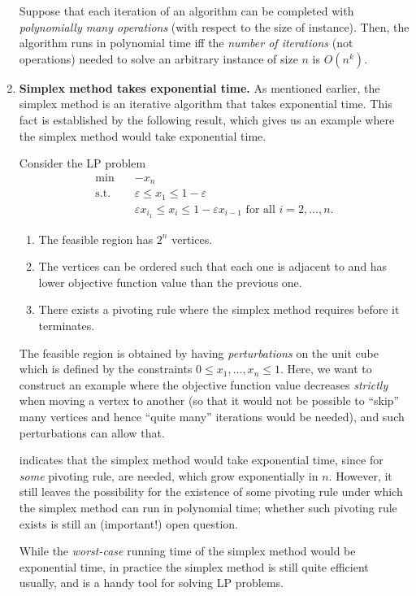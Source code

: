 \begin{enumerate}
Suppose that each iteration of an algorithm can be completed with
\emph{polynomially many operations} (with respect to the size of instance).
Then, the algorithm runs in polynomial time iff the \emph{number of iterations}
(not operations) needed to solve an arbitrary instance of size \(n\) is
\(O(n^k)\).
\item \textbf{Simplex method takes exponential time.} As mentioned earlier, the
simplex method is an iterative algorithm that takes exponential time. This fact
is established by the following result, which gives us an example where the
simplex method would take exponential time.

\begin{proposition}
\label{prp:simplex-expo-time}
Consider the LP problem
\begin{align*}
\text{min}\quad&-x_n \\
\text{s.t.}\quad&\varepsilon\le x_1\le 1-\varepsilon \\
&\varepsilon x_{i_1}\le x_i\le 1-\varepsilon x_{i-1}\text{ for all \(i=2,\dotsc,n\).}
\end{align*}
\begin{enumerate}
\item The feasible region has \(2^n\) vertices.
\item The vertices can be ordered such that each one is adjacent to and has
lower objective function value than the previous one.
\item There exists a pivoting rule where the simplex method requires
 before it terminates.
\end{enumerate}
\end{proposition}
\begin{intuition}
The feasible region is obtained by having \emph{perturbations} on the unit cube
which is defined by the constraints \(0\le x_1,\dotsc,x_n\le 1\). Here, we want
to construct an example where the objective function value decreases
\emph{strictly} when moving a vertex to another (so that it would not be
possible to ``skip'' many vertices and hence ``quite many'' iterations would be
needed), and such perturbations can allow that.
\end{intuition}

 indicates that the simplex method would take
exponential time, since for \emph{some} pivoting rule, 
are needed, which grow exponentially in \(n\). However, it still leaves the
possibility for the existence of some pivoting rule under which the simplex
method can run in polynomial time; whether such pivoting rule exists is still
an (important!) open question.

\begin{note}
While the \emph{worst-case} running time of the simplex method would be
exponential time, in practice the simplex method is still quite efficient
usually, and is a handy tool for solving LP problems.
\end{note}
\end{enumerate}
